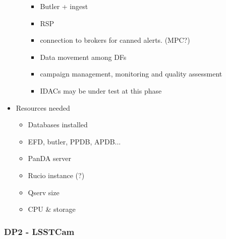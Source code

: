 \begin{itemize}
\begin{itemize}
\begin{itemize}
    \item \gls{Butler} + ingest
      
    \item \gls{RSP}
      
    \item connection to brokers for canned alerts. (\gls{MPC}?)
      
    \item Data movement among DFs
      
    \item campaign management, \gls{monitoring} and quality assessment
      
    \item IDACs may be under test at this phase
      
    \end{itemize}
    
  \end{itemize}
  
\item Resources needed
  
  \begin{itemize}
    
  \item Databases installed
    
  \item \gls{EFD}, butler, \gls{PPDB}, APDB...
    
  \item \gls{PanDA} server
    
  \item \gls{Rucio} instance (?)
    
  \item \gls{Qserv} size
    
  \item \gls{CPU} \& storage
    
  \end{itemize}
  
\end{itemize}

\subsubsection{DP2 - LSSTCam}

